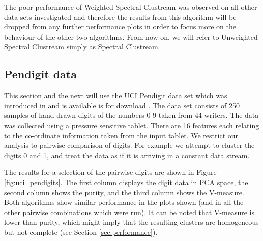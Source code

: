 The poor performance of Weighted Spectral Clustream was observed on all other data sets investigated and therefore the results from this algorithm  will be dropped from any further performance plots in order to focus more on the behaviour of the other two algorithms.  From now on, we will refer to Unweighted Spectral Clustream simply as Spectral Clustream.

\subsection{Pendigit data}
This section and the next will use the UCI Pendigit data set which was introduced in \cite{Alimoglu1996} and is available is for download \citep{Lichman2013}. The data set consists of 250 samples of hand drawn digits of the numbers 0-9 taken from 44 writers. The data was collected using a pressure sensitive tablet. There are 16 features each relating to the co-ordinate information taken from the input tablet. We restrict our analysis to pairwise comparison of digits. For example we attempt to cluster the digits 0 and 1, and treat the data as if it is arriving in a constant data stream.

The results for a selection of the pairwise digits are shown in Figure \ref{fig:uci_pendigits}. The first column displays the digit data in PCA space, the second column shows the purity, and the third column shows the V-measure. Both algorithms show similar performance in the plots shown (and in all the other pairwise combinations which were run).  It can be noted that V-measure is lower than purity, which might imply that the resulting clusters are homogeneous but not complete (see Section \ref{sec:performance}). 

